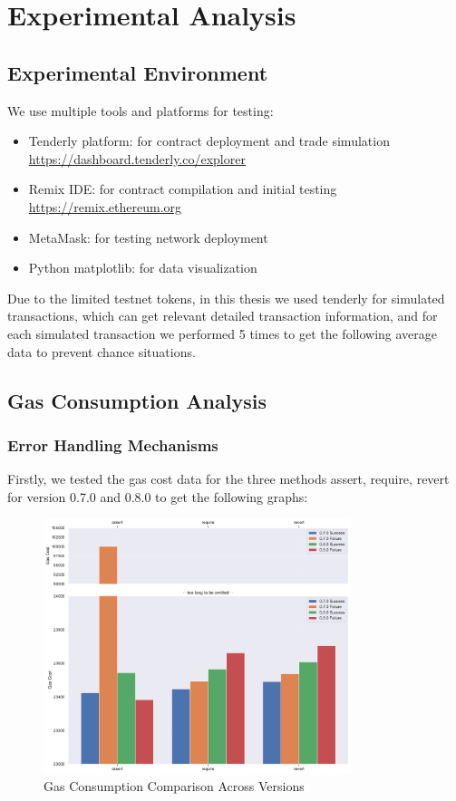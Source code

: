 \section{Experimental Analysis}

\subsection{Experimental Environment}
We use multiple tools and platforms for testing:
\begin{itemize}
    \item Tenderly platform: for contract deployment and trade simulation \url{https://dashboard.tenderly.co/explorer}
    \item Remix IDE: for contract compilation and initial testing \url{https://remix.ethereum.org}
    \item MetaMask: for testing network deployment
    \item Python matplotlib: for data visualization
\end{itemize}

Due to the limited testnet tokens, in this thesis we used tenderly for simulated transactions, which can get relevant detailed transaction information, and for each simulated transaction we performed 5 times to get the following average data to prevent chance situations.

\subsection{Gas Consumption Analysis}

\subsubsection{Error Handling Mechanisms}
Firstly, we tested the gas cost data for the three methods assert, require, revert for version 0.7.0 and 0.8.0 to get the following graphs:

\begin{figure}[h]
    \centering
    \includegraphics[width=0.8\textwidth]{figures/version_comparison.pdf}
    \caption{Gas Consumption Comparison Across Versions}
    \label{fig:version_comparison}
\end{figure}

